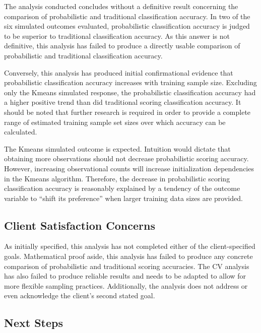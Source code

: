 \documentclass[12pt,]{article}
\begin{document}
The analysis conducted concludes without a definitive result concerning
the comparison of probabilistic and traditional classification accuracy.
In two of the six simulated outcomes evaluated, probabilistic
classification accuracy is judged to be superior to traditional
classification accuracy. As this answer is not definitive, this analysis
has failed to produce a directly usable comparison of probabilistic and
traditional classification accuracy.

Conversely, this analysis has produced initial confirmational evidence
that probabilistic classification accuracy increases with training
sample size. Excluding only the Kmeans simulated response, the
probabilistic classification accuracy had a higher positive trend than
did traditional scoring classification accuracy. It should be noted that
further research is required in order to provide a complete range of
estimated training sample set sizes over which accuracy can be
calculated.

The Kmeans simulated outcome is expected. Intuition would dictate that
obtaining more observations should not decrease probabilistic scoring
accuracy. However, increasing observational counts will increase
initialization dependencies in the Kmeans algorithm. Therefore, the
decrease in probabilistic scoring classification accuracy is reasonably
explained by a tendency of the outcome variable to ``shift its
preference'' when larger training data sizes are provided.

\hypertarget{client-satisfaction-concerns}{%
\subsection{Client Satisfaction
Concerns}\label{client-satisfaction-concerns}}

As initially specified, this analysis has not completed either of the
client-specified goals. Mathematical proof aside, this analysis has
failed to produce any concrete comparison of probabilistic and
traditional scoring accuracies. The CV analysis has also failed to
produce reliable results and needs to be adapted to allow for more
flexible sampling practices. Additionally, the analysis does not address
or even acknowledge the client's second stated goal.

\hypertarget{next-steps}{%
\subsection{Next Steps}\label{next-steps}}
\end{document}
